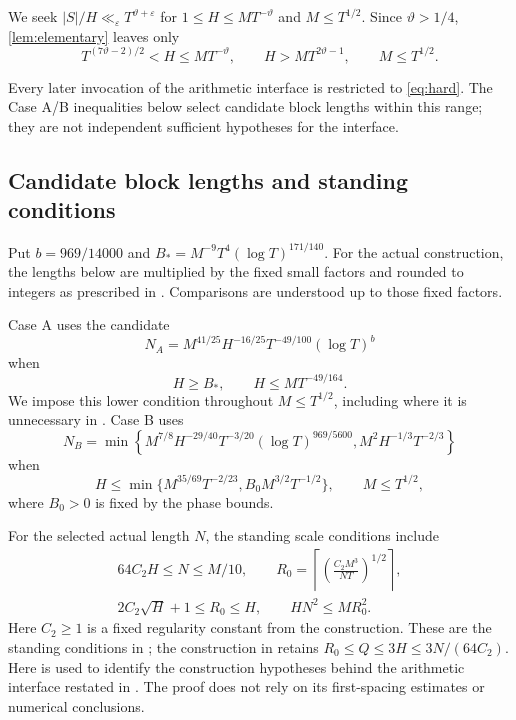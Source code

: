 \documentclass[11pt,reqno]{amsart}
\numberwithin{equation}{section}
\theoremstyle{definition}
\theoremstyle{remark}
\newcommand{\eps}{\varepsilon}
\newcommand{\vth}{\vartheta}
\newcommand{\blocklog}{b}
\begin{document}
We seek $|S|/H\ll_\eps T^{\vth+\eps}$ for
$1\le H\le MT^{-\vth}$ and $M\le T^{1/2}$.
Since $\vth>1/4$, \cref{lem:elementary} leaves only
\begin{equation}\label{eq:hard}
 T^{(7\vth-2)/2}<H\le MT^{-\vth},\qquad
 H>MT^{2\vth-1},\qquad M\le T^{1/2}.
\end{equation}


Every later invocation of the arithmetic interface is restricted to \eqref{eq:hard}. The Case A/B inequalities below select candidate block lengths within this range; they are not independent sufficient hypotheses for the interface.

\subsection{Candidate block lengths and standing conditions}
Put $\blocklog=969/14000$ and $B_*=M^{-9}T^4(\log T)^{171/140}$.
For the actual construction, the lengths below are multiplied by the fixed small factors and rounded to integers as prescribed in \cite{LY}. Comparisons are understood up to those fixed factors.

Case A uses the candidate
\begin{equation}\label{eq:NA}
 N_A=M^{41/25}H^{-16/25}T^{-49/100}(\log T)^{\blocklog}
\end{equation}
when
\begin{equation}\label{eq:caseA}
 H\ge B_*,\qquad H\le MT^{-49/164}.
\end{equation}
We impose this lower condition throughout $M\le T^{1/2}$, including where it is unnecessary in \cite{LY}.
Case B uses
\begin{equation}\label{eq:NB}
 N_B=\min\left\{
 M^{7/8}H^{-29/40}T^{-3/20}(\log T)^{969/5600},
 M^2H^{-1/3}T^{-2/3}\right\}
\end{equation}
when
\begin{equation}\label{eq:caseB}
 H\le\min\{M^{35/69}T^{-2/23},B_0M^{3/2}T^{-1/2}\},
 \qquad M\le T^{1/2},
\end{equation}
where $B_0>0$ is fixed by the phase bounds.

For the selected actual length $N$, the standing scale conditions include
\begin{gather}
 64C_2H\le N\le M/10,\qquad
 R_0=\left\lceil\left(\frac{C_2M^3}{NT}\right)^{1/2}\right\rceil,
 \label{eq:standingN}\\
 2C_2\sqrt H+1\le R_0\le H,\qquad HN^2\le MR_0^2.
 \label{eq:standing}
\end{gather}
Here $C_2\ge1$ is a fixed regularity constant from the construction.
These are the standing conditions in \cite[(5.2)--(5.5)]{BW17}; the construction in \cite[(4.12)--(4.13)]{LY} retains $R_0\le Q\le3H\le3N/(64C_2)$.
Here \cite{BW17} is used to identify the construction hypotheses behind the arithmetic interface restated in \cite{LY}. The proof does not rely on its first-spacing estimates or numerical conclusions.
\end{document}
